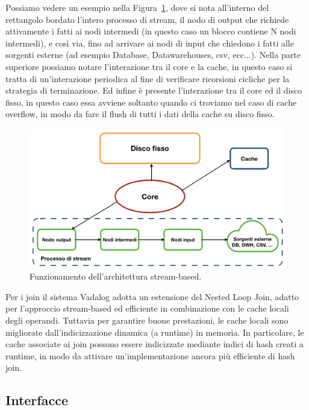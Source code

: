 Possiamo vedere un esempio nella Figura~\ref{fig:architettura_1}, dove si nota all'interno del rettangolo bordato l'intero processo di stream, il nodo di output che richiede attivamente i fatti ai nodi intermedi (in questo caso un blocco contiene N nodi intermedi), e così via, fino ad arrivare ai nodi di input che chiedono i fatti alle sorgenti esterne (ad esempio Database, Datawarehouses, csv, ecc...). \newline
Nella parte superiore possiamo notare l'interazione tra il core e la cache, in questo caso si tratta di un'interazione periodica al fine di verificare ricorsioni cicliche per la strategia di terminazione. \newline
Ed infine è presente l'interazione tra il core ed il disco fisso, in questo caso essa avviene soltanto quando ci troviamo nel caso di cache overflow, in modo da fare il flush di tutti i dati della cache su disco fisso.\newpage \clearpage

\begin{figure}[h!]
	\centering
	\includegraphics[width=0.8\linewidth]{figure/architettura-1}
	\caption{Funzionamento dell'architettura stream-based.}
	\label{fig:architettura_1}
\end{figure}

Per i join il sistema Vadalog adotta un estensione del Nested Loop Join, adatto per l'approccio stream-based ed efficiente in combinazione con le cache locali degli operandi. \newline
Tuttavia per garantire buone prestazioni, le cache locali sono migliorate dall'indicizzazione dinamica (a runtime) in memoria. In particolare, le cache associate ai join possono essere indicizzate mediante indici di hash creati a runtime, in modo da attivare un'implementazione ancora più efficiente di hash join.

\subsection{Interfacce}


